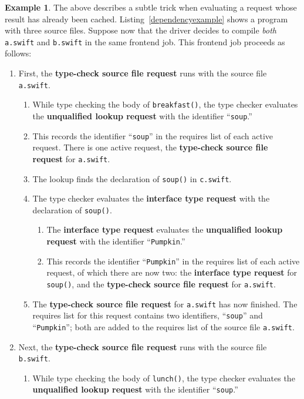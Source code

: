 \documentclass[a4paper,headsepline,bibliography=totoc,toc=flat,fleqn,twoside=semi]{scrbook}
\theoremstyle{definition}
\theoremstyle{definition}
\newtheorem{example}{Example}[chapter]
\theoremstyle{definition}
\begin{document}
\begin{example}
The above describes a subtle trick when evaluating a request whose result has already been cached. Listing~\ref{dependencyexample} shows a program with three source files. Suppose now that the driver decides to compile \emph{both} \texttt{a.swift} and \texttt{b.swift} in the same frontend job. This frontend job proceeds as follows:
\begin{enumerate}
\item First, the \textbf{type-check source file request} runs with the source file \texttt{a.swift}.
\begin{enumerate}
\item While type checking the body of \texttt{breakfast()}, the type checker evaluates the \textbf{unqualified lookup request} with the identifier ``\texttt{soup}.''
\item This records the identifier ``\texttt{soup}'' in the requires list of each active request. There is one active request, the \textbf{type-check source file request} for \texttt{a.swift}.
\item The lookup finds the declaration of \texttt{soup()} in \texttt{c.swift}.
\item The type checker evaluates the \textbf{interface type request} with the declaration of \texttt{soup()}.
\begin{enumerate}
\item The \textbf{interface type request} evaluates the \textbf{unqualified lookup request} with the identifier ``\texttt{Pumpkin}.''
\item This records the identifier ``\texttt{Pumpkin}'' in the requires list of each active request, of which there are now two: the \textbf{interface type request} for \texttt{soup()}, and the \textbf{type-check source file request} for \texttt{a.swift}.
\end{enumerate}
\item The \textbf{type-check source file request} for \texttt{a.swift} has now finished. The requires list for this request contains two identifiers, ``\texttt{soup}'' and ``\texttt{Pumpkin}''; both are added to the requires list of the source file \texttt{a.swift}.
\end{enumerate}
\item Next, the \textbf{type-check source file request} runs with the source file \texttt{b.swift}.
\begin{enumerate}
\item While type checking the body of \texttt{lunch()}, the type checker evaluates the \textbf{unqualified lookup request} with the identifier ``\texttt{soup}.''

\end{enumerate}
\end{enumerate}
\end{example}
\end{document}
